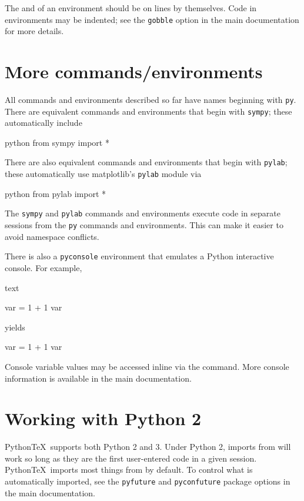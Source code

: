 \documentclass[twocolumn]{article}
\newcommand{\pytex}{Python\TeX}
\begin{document}
{The  and  of an environment should be on lines by themselves.  Code in environments may be indented; see the \texttt{gobble} option in the main documentation for more details.


\section*{More commands/environments}

All commands and environments described so far have names beginning with \texttt{py}.  There are equivalent commands and environments that begin with \texttt{sympy}; these automatically include
\begin{pygments}{python}
from sympy import *
\end{pygments}
There are also equivalent commands and environments that begin with \texttt{pylab}; these automatically use matplotlib's \texttt{pylab} module via
\begin{pygments}{python}
from pylab import *
\end{pygments}
The \texttt{sympy} and \texttt{pylab} commands and environments execute code in separate sessions from the \texttt{py} commands and environments.  This can make it easier to avoid namespace conflicts.

There is also a \texttt{pyconsole} environment that emulates a Python interactive console.  For example,
\begin{pygments}{text}
\begin{pyconsole}
var = 1 + 1
var
\end{pyconsole}
\end{pygments}
yields
\begin{pyconsole}
var = 1 + 1
var
\end{pyconsole}
Console variable values may be accessed inline via the  command.  More console information is available in the main documentation.

\section*{Working with Python 2}
\pytex\ supports both Python 2 and 3.  Under Python 2, imports from  will work so long as they are the first user-entered code in a given session.  \pytex\ imports most things from  by default.  To control what is automatically imported, see the \texttt{pyfuture} and \texttt{pyconfuture} package options in the main documentation.


}
\end{document}
